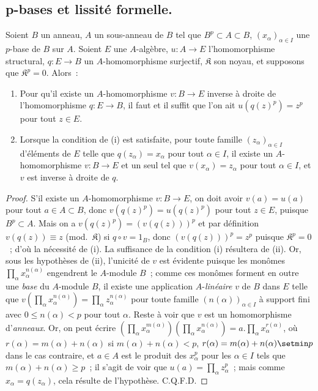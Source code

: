 \subsection{p-bases et lissité formelle.}
\label{0.21.2-fr}

\begin{theorem}[21.2.1]
\label{0.21.2.1-fr}
Soient $B$ un anneau, $A$ un sous-anneau de $B$ tel que $B^p\subset A\subset B$,
$(x_\alpha)_{\alpha\in I}$ une $p$-base de $B$ sur $A$.
Soient $E$ une $A$-algèbre, $u:A\to E$ l'homomorphisme structural,
$q:E\to B$ un $A$-homomorphisme surjectif, $\mathfrak K$ son noyau, et
supposons que $\mathfrak K^p=0$. Alors~:
\begin{enumerate}
  \item[\textup{(i)}] Pour qu'il existe un $A$-homomorphisme $v:B\to E$ inverse à
  droite de l'homomorphisme $q:E\to B$, il faut et il suffit que l'on ait
  $u(q(z)^p)=z^p$ pour tout $z\in E$.
  \item[\textup{(ii)}] Lorsque la condition de \textup{(i)} est satisfaite, pour toute famille
  $(z_\alpha)_{\alpha\in I}$ d'éléments de $E$ telle que
  $q(z_\alpha)=x_\alpha$ pour tout $\alpha\in I$, il existe un
  $A$-homomorphisme $v:B\to E$ et un seul tel que $v(x_\alpha)=z_\alpha$
  pour tout $\alpha\in I$, et $v$ est inverse à droite de $q$.
\end{enumerate}
\end{theorem}

\begin{proof}
S'il existe un $A$-homomorphisme $v:B\to E$, on doit avoir $v(a)=u(a)$ pour
tout $a\in A\subset B$, donc $v(q(z)^p)=u(q(z)^p)$ pour tout $z\in E$,
puisque $B^p\subset A$. Mais on a $v(q(z)^p)=(v(q(z)))^p$ et par définition
$v(q(z))\equiv z$ (mod.~$\mathfrak K$) si $q\circ v=1_B$, donc
$(v(q(z)))^p=z^p$ puisque $\mathfrak K^p=0$~; d'où la nécessité de (i).
La suffisance de la condition (i) résultera de (ii).
Or, sous les hypothèses de (ii), l'unicité de $v$ est évidente puisque les
monômes $\prod_\alpha x_\alpha^{n(\alpha)}$ engendrent le $A$-module $B$~;
comme ces monômes forment en outre une \emph{base} du $A$-module $B$, il existe
une application $A$-\emph{linéaire} $v$ de $B$ dans $E$ telle que
$v(\prod_\alpha x_\alpha^{n(\alpha)})=\prod_\alpha z_\alpha^{n(\alpha)}$
pour toute famille $(n(\alpha))_{\alpha\in I}$ à support fini avec
$0\leq n(\alpha)<p$ pour tout $\alpha$. Reste à voir que $v$ est un
homomorphisme d'\emph{anneaux}. Or, on peut écrire
$(\prod_\alpha x_\alpha^{m(\alpha)})(\prod_\alpha x_\alpha^{n(\alpha)})
=a.\prod_\alpha x_\alpha^{r(\alpha)}$, où
$r(\alpha)=m(\alpha)+n(\alpha)$ si $m(\alpha)+n(\alpha)<p$,
$r(\alpha)=m(\alpha)+n(\alpha)\setmin p$ dans le cas contraire, et $a\in A$
est le produit des $x_\alpha^p$ pour les $\alpha\in I$ tels que
$m(\alpha)+n(\alpha)\geq p$~; il s'agit de voir que
$u(a)=\prod_\alpha z_\alpha^p$~; mais comme $x_\alpha=q(z_\alpha)$, cela
résulte de l'hypothèse. C.Q.F.D.
\end{proof}

